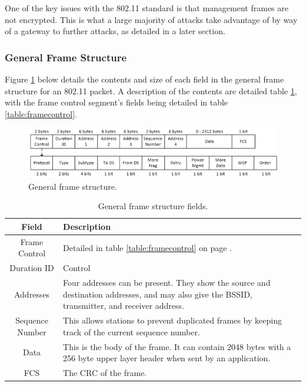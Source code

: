 One of the key issues with the 802.11 standard is that management frames are not encrypted. This is what a large majority of attacks take advantage of by way of a gateway to further attacks, as detailed in a later section.

\clearpage
\subsubsection{General Frame Structure}
Figure \ref{fig:framestructure} below details the contents and size of each field in the general frame structure for an 802.11 packet. A description of the contents are detailed table \ref{table:framefields}, with the frame control segment's fields being detailed in table \ref{table:framecontrol}.

\begin{figure}[h!]
\centering\includegraphics[width=\linewidth]{research/80211/figures/framestructure.png}
\caption{General frame structure.}
\label{fig:framestructure}
\end{figure}

	\begin{table}[!h]
\begin{center}
	\begin{tabular}{| c |  p{5cm} |}
		\hline
		\textbf{Field} & \textbf{Description} \\ \hline
		Frame Control & Detailed in table \ref{table:framecontrol} on page \pageref{table:framecontrol}.\\ \hline
		Duration ID & Control \\ \hline
		Addresses & Four addresses can be present.  They show the source and destination addresses, and may also give the BSSID, transmitter, and receiver address.  \\ \hline
		Sequence Number & This allows stations to prevent duplicated frames by keeping track of the current sequence number. \\ \hline
		Data & This is the body of the frame. It can contain 2048 bytes with a 256 byte upper layer header when sent by an application. \\ \hline
		FCS & The CRC \cite{research:crc_wiki} of the frame. \\ \hline
	\end{tabular}
	\caption{General frame structure fields.}
	\label{table:framefields}
\end{center}
	\end{table}

